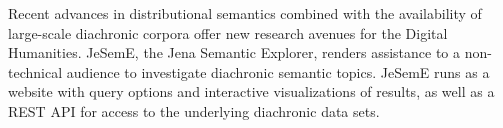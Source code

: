 Recent advances in distributional semantics combined with the availability of large-scale diachronic corpora offer new research avenues for the Digital Humanities. JeSemE, the Jena Semantic Explorer, renders assistance to a non-technical audience to investigate diachronic semantic topics. JeSemE runs as a website with query options and interactive visualizations of results, as well as a REST API for access to the underlying diachronic data sets.
